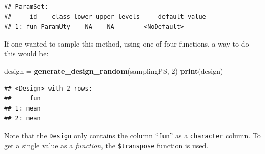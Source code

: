 \documentclass[]{article}
\newenvironment{Shaded}{\begin{snugshade}}{\end{snugshade}}
\newcommand{\CommentTok}[1]{\textcolor[rgb]{0.56,0.35,0.01}{\textit{#1}}}
\newcommand{\ControlFlowTok}[1]{\textcolor[rgb]{0.13,0.29,0.53}{\textbf{#1}}}
\newcommand{\DataTypeTok}[1]{\textcolor[rgb]{0.13,0.29,0.53}{#1}}
\newcommand{\DecValTok}[1]{\textcolor[rgb]{0.00,0.00,0.81}{#1}}
\newcommand{\KeywordTok}[1]{\textcolor[rgb]{0.13,0.29,0.53}{\textbf{#1}}}
\newcommand{\NormalTok}[1]{#1}
\newcommand{\OperatorTok}[1]{\textcolor[rgb]{0.81,0.36,0.00}{\textbf{#1}}}
\newcommand{\StringTok}[1]{\textcolor[rgb]{0.31,0.60,0.02}{#1}}
\renewenvironment{Shaded} {\begin{snugshade}\small} {\end{snugshade}}
\begin{document}
\begin{verbatim}
## ParamSet: 
##     id    class lower upper levels     default value
## 1: fun ParamUty    NA    NA        <NoDefault>
\end{verbatim}

If one wanted to sample this method, using one of four functions, a way to do this would be:

\begin{Shaded}
\end{Shaded}

\begin{Shaded}
\begin{Highlighting}[]
\NormalTok{design =}\StringTok{ }\KeywordTok{generate_design_random}\NormalTok{(samplingPS, }\DecValTok{2}\NormalTok{)}
\KeywordTok{print}\NormalTok{(design)}
\end{Highlighting}
\end{Shaded}

\begin{verbatim}
## <Design> with 2 rows:
##     fun
## 1: mean
## 2: mean
\end{verbatim}

Note that the \texttt{Design} only contains the column ``\texttt{fun}'' as a \texttt{character} column.
To get a single value as a \emph{function}, the \texttt{\$transpose} function is used.

\begin{Shaded}
\end{Shaded}
\end{document}
